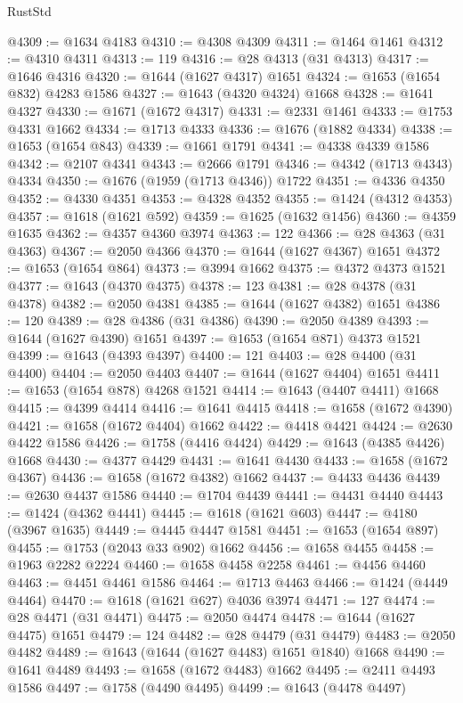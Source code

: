 \begin{lexlean}{RustStd}
\begin{coremodule}
@4309 := @1634 @4183
@4310 := @4308 @4309
@4311 := @1464 @1461
@4312 := @4310 @4311
@4313 := 119
@4316 := @28 @4313 (@31 @4313)
@4317 := @1646 @4316
@4320 := @1644 (@1627 @4317) @1651
@4324 := @1653 (@1654 @832) @4283 @1586
@4327 := @1643 (@4320 @4324) @1668
@4328 := @1641 @4327
@4330 := @1671 (@1672 @4317)
@4331 := @2331 @1461
@4333 := @1753 @4331 @1662
@4334 := @1713 @4333
@4336 := @1676 (@1882 @4334)
@4338 := @1653 (@1654 @843)
@4339 := @1661 @1791
@4341 := @4338 @4339 @1586
@4342 := @2107 @4341
@4343 := @2666 @1791
@4346 := @4342 (@1713 @4343) @4334
@4350 := @1676 (@1959 (@1713 @4346)) @1722
@4351 := @4336 @4350
@4352 := @4330 @4351
@4353 := @4328 @4352
@4355 := @1424 (@4312 @4353)
@4357 := @1618 (@1621 @592)
@4359 := @1625 (@1632 @1456)
@4360 := @4359 @1635
@4362 := @4357 @4360 @3974
@4363 := 122
@4366 := @28 @4363 (@31 @4363)
@4367 := @2050 @4366
@4370 := @1644 (@1627 @4367) @1651
@4372 := @1653 (@1654 @864)
@4373 := @3994 @1662
@4375 := @4372 @4373 @1521
@4377 := @1643 (@4370 @4375)
@4378 := 123
@4381 := @28 @4378 (@31 @4378)
@4382 := @2050 @4381
@4385 := @1644 (@1627 @4382) @1651
@4386 := 120
@4389 := @28 @4386 (@31 @4386)
@4390 := @2050 @4389
@4393 := @1644 (@1627 @4390) @1651
@4397 := @1653 (@1654 @871) @4373 @1521
@4399 := @1643 (@4393 @4397)
@4400 := 121
@4403 := @28 @4400 (@31 @4400)
@4404 := @2050 @4403
@4407 := @1644 (@1627 @4404) @1651
@4411 := @1653 (@1654 @878) @4268 @1521
@4414 := @1643 (@4407 @4411) @1668
@4415 := @4399 @4414
@4416 := @1641 @4415
@4418 := @1658 (@1672 @4390)
@4421 := @1658 (@1672 @4404) @1662
@4422 := @4418 @4421
@4424 := @2630 @4422 @1586
@4426 := @1758 (@4416 @4424)
@4429 := @1643 (@4385 @4426) @1668
@4430 := @4377 @4429
@4431 := @1641 @4430
@4433 := @1658 (@1672 @4367)
@4436 := @1658 (@1672 @4382) @1662
@4437 := @4433 @4436
@4439 := @2630 @4437 @1586
@4440 := @1704 @4439
@4441 := @4431 @4440
@4443 := @1424 (@4362 @4441)
@4445 := @1618 (@1621 @603)
@4447 := @4180 (@3967 @1635)
@4449 := @4445 @4447 @1581
@4451 := @1653 (@1654 @897)
@4455 := @1753 (@2043 @33 @902) @1662
@4456 := @1658 @4455
@4458 := @1963 @2282 @2224
@4460 := @1658 @4458 @2258
@4461 := @4456 @4460
@4463 := @4451 @4461 @1586
@4464 := @1713 @4463
@4466 := @1424 (@4449 @4464)
@4470 := @1618 (@1621 @627) @4036 @3974
@4471 := 127
@4474 := @28 @4471 (@31 @4471)
@4475 := @2050 @4474
@4478 := @1644 (@1627 @4475) @1651
@4479 := 124
@4482 := @28 @4479 (@31 @4479)
@4483 := @2050 @4482
@4489 := @1643 (@1644 (@1627 @4483) @1651 @1840) @1668
@4490 := @1641 @4489
@4493 := @1658 (@1672 @4483) @1662
@4495 := @2411 @4493 @1586
@4497 := @1758 (@4490 @4495)
@4499 := @1643 (@4478 @4497)

\end{coremodule}
\end{lexlean}
